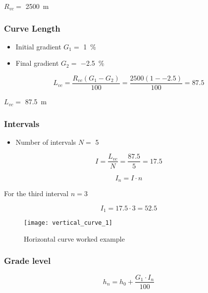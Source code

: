 \documentclass{bcrre_exam}
\begin{document}
$R_{vc}=$ \qty{2500}{m}

\subsubsection*{Curve Length}

\begin{itemize}
    \item Initial gradient $G_1=$ \qty{1}{\percent}
    \item Final gradient $G_2=$ \qty{-2.5}{\percent}
\end{itemize}

\begin{equation}
    L_{vc} = \frac{R_{vc}(G_1-G_2)}{100}=\frac{2500(1--2.5)}{100}=87.5
\end{equation}

$L_{vc}=$ \qty{87.5}{m}

\subsubsection*{Intervals}

\begin{itemize}
    \item Number of intervals $N=$ \num{5}
\end{itemize}

\begin{equation}
    I = \frac{L_{vc}}{N} = \frac{87.5}{5} = 17.5
\end{equation}

\begin{equation}
    I_n = I \cdot n
\end{equation}

For the third interval $n=3$

\begin{equation}
    I_1 = 17.5 \cdot 3 = 52.5
\end{equation}

\begin{figure}[h]
    \centering
    \texttt{[image: vertical\_curve\_1]}
    \caption{Horizontal curve worked example}
    \label{fig:hoz-cur-1}
\end{figure}

\subsubsection*{Grade level}

\begin{equation}
    h_n=h_0+\frac{G_1 \cdot I_n}{100}
\end{equation}
\end{document}
